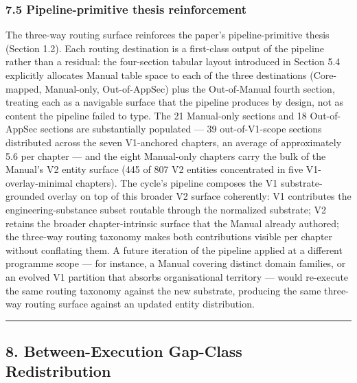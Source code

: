 \documentclass[
]{article}
\begin{document}
\subsubsection{7.5 Pipeline-primitive thesis
reinforcement}\label{pipeline-primitive-thesis-reinforcement}

The three-way routing surface reinforces the paper's pipeline-primitive
thesis (Section 1.2). Each routing destination is a first-class output
of the pipeline rather than a residual: the four-section tabular layout
introduced in Section 5.4 explicitly allocates Manual table space to
each of the three destinations (Core-mapped, Manual-only, Out-of-AppSec)
plus the Out-of-Manual fourth section, treating each as a navigable
surface that the pipeline produces by design, not as content the
pipeline failed to type. The 21 Manual-only sections and 18
Out-of-AppSec sections are substantially populated --- 39
out-of-V1-scope sections distributed across the seven V1-anchored
chapters, an average of approximately 5.6 per chapter --- and the eight
Manual-only chapters carry the bulk of the Manual's V2 entity surface
(445 of 807 V2 entities concentrated in five V1-overlay-minimal
chapters). The cycle's pipeline composes the V1 substrate-grounded
overlay on top of this broader V2 surface coherently: V1 contributes the
engineering-substance subset routable through the normalized substrate;
V2 retains the broader chapter-intrinsic surface that the Manual already
authored; the three-way routing taxonomy makes both contributions
visible per chapter without conflating them. A future iteration of the
pipeline applied at a different programme scope --- for instance, a
Manual covering distinct domain families, or an evolved V1 partition
that absorbs organisational territory --- would re-execute the same
routing taxonomy against the new substrate, producing the same three-way
routing surface against an updated entity distribution.

\begin{center}\rule{0.5\linewidth}{0.5pt}\end{center}

\subsection{8. Between-Execution Gap-Class
Redistribution}\label{between-execution-gap-class-redistribution}
\end{document}
